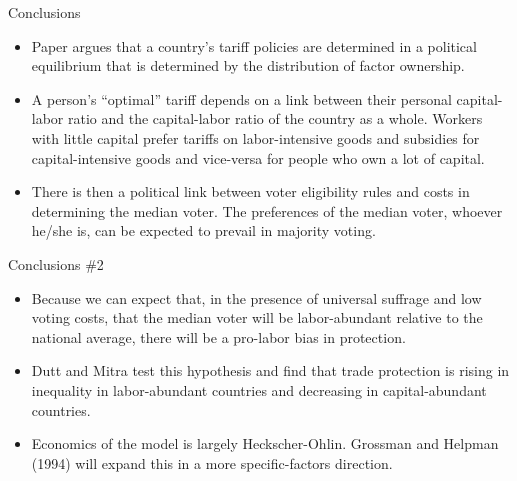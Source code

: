 \documentclass[aspectratio=169]{beamer}
\begin{document}
\begin{frame}{Conclusions}

\begin{itemize}
    \item<1-> Paper argues that a country’s tariff policies are determined in a political equilibrium that is determined by the distribution of factor ownership.
    \item<2-> A person’s ``optimal” tariff depends on a link between their personal capital-labor ratio and the capital-labor ratio of the country as a whole.  Workers with little capital prefer tariffs on labor-intensive goods and subsidies for capital-intensive goods and vice-versa for people who own a lot of capital.
    \item<3-> There is then a political link between voter eligibility rules and costs in determining the median voter.  The preferences of the median voter, whoever he/she is, can be expected to prevail in majority voting.
\end{itemize}
    
\end{frame}


\begin{frame}{Conclusions \#2}

\begin{itemize}
    \item<1-> Because we can expect that, in the presence of universal suffrage and low voting costs, that the median voter will be labor-abundant relative to the national average, there will be a pro-labor bias in protection.
    \item<2-> Dutt and Mitra test this hypothesis and find that trade protection is rising in inequality in labor-abundant countries and decreasing in capital-abundant countries.
    \item<3-> Economics of the model is largely Heckscher-Ohlin.  Grossman and Helpman (1994) will expand this in a more specific-factors direction.
\end{itemize}
    
\end{frame}

\end{document}
